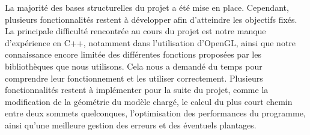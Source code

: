 \documentclass[12pt,a4paper]{article}
\begin{document}
La majorité des bases structurelles du projet a été mise en place. Cependant, plusieurs fonctionnalités restent à développer afin d'atteindre les objectifs fixés.
La principale difficulté rencontrée au cours du projet est notre manque d'expérience en C++, notamment dans l'utilisation d'OpenGL, ainsi que notre connaissance encore limitée des différentes fonctions proposées par les bibliothèques que nous utilisons. Cela nous a demandé du temps pour comprendre leur fonctionnement et les utiliser correctement.
Plusieurs fonctionnalités restent à implémenter pour la suite du projet, comme la modification de la géométrie du modèle chargé, le calcul du plus court chemin entre deux sommets quelconques, l'optimisation des performances du programme, ainsi qu'une meilleure gestion des erreurs et des éventuels plantages.

\vspace{5cm}
\end{document}
